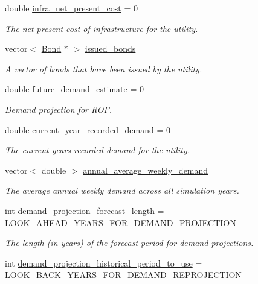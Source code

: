 \begin{DoxyCompactItemize}
double \mbox{\hyperlink{classUtility_a59d009825a96c734953f27edfa9e587e}{infra\+\_\+net\+\_\+present\+\_\+cost}} = 0
\begin{DoxyCompactList}\small\item\em The net present cost of infrastructure for the utility. \end{DoxyCompactList}\item 
vector$<$ \mbox{\hyperlink{classBond}{Bond}} $\ast$ $>$ \mbox{\hyperlink{classUtility_ae100f50a95593230b2571bb746364186}{issued\+\_\+bonds}}
\begin{DoxyCompactList}\small\item\em A vector of bonds that have been issued by the utility. \end{DoxyCompactList}\item 
double \mbox{\hyperlink{classUtility_ad7ff0fe8ac967ccc347369778dbca076}{future\+\_\+demand\+\_\+estimate}} = 0
\begin{DoxyCompactList}\small\item\em Demand projection for R\+OF. \end{DoxyCompactList}\item 
double \mbox{\hyperlink{classUtility_affc473409dadd1791e79aa9bbbe98dd2}{current\+\_\+year\+\_\+recorded\+\_\+demand}} = 0
\begin{DoxyCompactList}\small\item\em The current year\textquotesingle{}s recorded demand for the utility. \end{DoxyCompactList}\item 
vector$<$ double $>$ \mbox{\hyperlink{classUtility_a7a8e49d34c5bb984d19c475abb6b04d0}{annual\+\_\+average\+\_\+weekly\+\_\+demand}}
\begin{DoxyCompactList}\small\item\em The average annual weekly demand across all simulation years. \end{DoxyCompactList}\item 
int \mbox{\hyperlink{classUtility_a50fd81c790bf79ac989effa1bd3edaec}{demand\+\_\+projection\+\_\+forecast\+\_\+length}} = L\+O\+O\+K\+\_\+\+A\+H\+E\+A\+D\+\_\+\+Y\+E\+A\+R\+S\+\_\+\+F\+O\+R\+\_\+\+D\+E\+M\+A\+N\+D\+\_\+\+P\+R\+O\+J\+E\+C\+T\+I\+ON
\begin{DoxyCompactList}\small\item\em The length (in years) of the forecast period for demand projections. \end{DoxyCompactList}\item 
int \mbox{\hyperlink{classUtility_a8a23a796bff4447ae20a1cd3e97661c1}{demand\+\_\+projection\+\_\+historical\+\_\+period\+\_\+to\+\_\+use}} = L\+O\+O\+K\+\_\+\+B\+A\+C\+K\+\_\+\+Y\+E\+A\+R\+S\+\_\+\+F\+O\+R\+\_\+\+D\+E\+M\+A\+N\+D\+\_\+\+R\+E\+P\+R\+O\+J\+E\+C\+T\+I\+ON

\end{DoxyCompactItemize}
